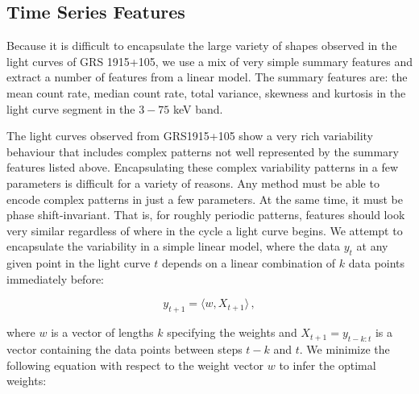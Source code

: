 \documentclass[12pt]{emulateapj}
\begin{document}
\subsection{Time Series Features}

Because it is difficult to encapsulate the large variety of shapes observed in the light curves of GRS 1915+105, we use a mix of very simple summary features and extract a number of features from a linear model. The summary features are: the mean count rate, median count rate, total variance, skewness and kurtosis in the light curve segment in the $3 - 75$ keV band. 

The light curves observed from GRS1915+105 show a very rich variability behaviour that includes complex patterns not well represented by the summary features listed above. Encapsulating these complex variability patterns in a few parameters is difficult for a variety of reasons. Any method must be able to encode complex patterns in just a few parameters. At the same time, it must be phase shift-invariant. That is, for roughly periodic patterns, features should look very similar regardless of where in the cycle a light curve begins. We attempt to encapsulate the variability in a simple linear model, where the data $y_t$ at any given point in the light curve $t$ depends on a linear combination of $k$ data points immediately before:

\begin{equation}
y_{t+1} = \langle w, X_{t+1} \rangle \, ,
\end{equation}

\noindent  where $w$ is a vector of lengths $k$ specifying the weights and $X_{t+1} = y_{t-k:t}$ is a vector containing the data points between steps $t-k$ and $t$.
We minimize the following equation with respect to the weight vector $w$ to infer the optimal weights:
\end{document}
